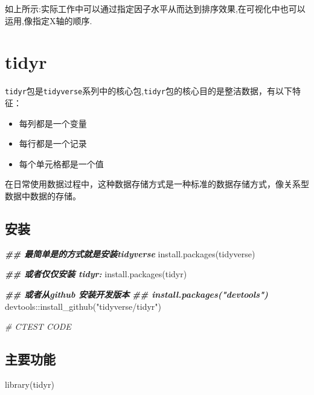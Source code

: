 \documentclass[
]{book}
\newenvironment{Shaded}{\begin{snugshade}}{\end{snugshade}}
\newcommand{\CommentTok}[1]{\textcolor[rgb]{0.56,0.35,0.01}{\textit{#1}}}
\newcommand{\DocumentationTok}[1]{\textcolor[rgb]{0.56,0.35,0.01}{\textbf{\textit{#1}}}}
\newcommand{\FunctionTok}[1]{\textcolor[rgb]{0.00,0.00,0.00}{#1}}
\newcommand{\NormalTok}[1]{#1}
\newcommand{\SpecialCharTok}[1]{\textcolor[rgb]{0.00,0.00,0.00}{#1}}
\newcommand{\StringTok}[1]{\textcolor[rgb]{0.31,0.60,0.02}{#1}}
\providecommand{\tightlist}{%
  \setlength{\itemsep}{0pt}\setlength{\parskip}{0pt}}
\begin{document}
如上所示:实际工作中可以通过指定因子水平从而达到排序效果,在可视化中也可以运用,像指定X轴的顺序.

\hypertarget{tidyr}{%
\chapter{tidyr}\label{tidyr}}

\texttt{tidyr}包是\texttt{tidyverse}系列中的核心包,\texttt{tidyr}包的核心目的是整洁数据，有以下特征：

\begin{itemize}
\tightlist
\item
  每列都是一个变量
\item
  每行都是一个记录
\item
  每个单元格都是一个值
\end{itemize}

在日常使用数据过程中，这种数据存储方式是一种标准的数据存储方式，像关系型数据中数据的存储。

\hypertarget{ux5b89ux88c5-2}{%
\section{安装}\label{ux5b89ux88c5-2}}

\begin{Shaded}
\begin{Highlighting}[]
\DocumentationTok{\#\# 最简单是的方式就是安装tidyverse}
\FunctionTok{install.packages}\NormalTok{(}\StringTok{\textquotesingle{}tidyverse\textquotesingle{}}\NormalTok{)}

\DocumentationTok{\#\# 或者仅仅安装 tidyr:}
\FunctionTok{install.packages}\NormalTok{(}\StringTok{\textquotesingle{}tidyr\textquotesingle{}}\NormalTok{)}

\DocumentationTok{\#\# 或者从github 安装开发版本}
\DocumentationTok{\#\# install.packages("devtools")}
\NormalTok{devtools}\SpecialCharTok{::}\FunctionTok{install\_github}\NormalTok{(}\StringTok{"tidyverse/tidyr"}\NormalTok{)}

\CommentTok{\# CTEST CODE}
\end{Highlighting}
\end{Shaded}

\hypertarget{ux4e3bux8981ux529fux80fd}{%
\section{主要功能}\label{ux4e3bux8981ux529fux80fd}}

\begin{Shaded}
\begin{Highlighting}[]
\FunctionTok{library}\NormalTok{(tidyr)}
\end{Highlighting}
\end{Shaded}
\end{document}
